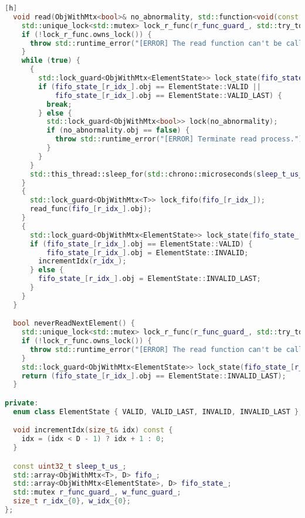 \documentclass[11pt,a4j]{jarticle}
\begin{document}
\begin{lstlisting}[language=c++,firstnumber=last,caption=MultiThreadFIFO,label=code:muitithreadfifo][h]
  void read(ObjWithMtx<bool>& no_abnormality, std::function<void(const T&)> read_func) {
    std::unique_lock<std::mutex> lock_r_func(r_func_guard_, std::try_to_lock);
    if (!lock_r_func.owns_lock()) {
      throw std::runtime_error("[ERROR] The read function can't be called at the same time from multiple threads.");
    }
    while (true) {
      {
        std::lock_guard<ObjWithMtx<ElementState>> lock_state(fifo_state_[r_idx_]);
        if (fifo_state_[r_idx_].obj == ElementState::VALID ||
            fifo_state_[r_idx_].obj == ElementState::VALID_LAST) {
          break;
        } else {
          std::lock_guard<ObjWithMtx<bool>> lock(no_abnormality);
          if (no_abnormality.obj == false) {
            throw std::runtime_error("[ERROR] Terminate read process.");
          }
        }
      }
      std::this_thread::sleep_for(std::chrono::microseconds(sleep_t_us_));
    }
    {
      std::lock_guard<ObjWithMtx<T>> lock_fifo(fifo_[r_idx_]);
      read_func(fifo_[r_idx_].obj);
    }
    {
      std::lock_guard<ObjWithMtx<ElementState>> lock_state(fifo_state_[r_idx_]);
      if (fifo_state_[r_idx_].obj == ElementState::VALID) {
          fifo_state_[r_idx_].obj = ElementState::INVALID;
        incrementIdx(r_idx_);
      } else {
        fifo_state_[r_idx_].obj = ElementState::INVALID_LAST;
      }
    }
  }

  bool neverReadNextElement() {
    std::unique_lock<std::mutex> lock_r_func(r_func_guard_, std::try_to_lock);
    if (!lock_r_func.owns_lock()) {
      throw std::runtime_error("[ERROR] The read function can't be called at the same time from multiple threads.");
    }
    std::lock_guard<ObjWithMtx<ElementState>> lock_state(fifo_state_[r_idx_]);
    return (fifo_state_[r_idx_].obj == ElementState::INVALID_LAST);
  }

private:
  enum class ElementState { VALID, VALID_LAST, INVALID, INVALID_LAST };

  void incrementIdx(size_t& idx) const {
    idx = (idx < D - 1) ? idx + 1 : 0;
  }

  const uint32_t sleep_t_us_;
  std::array<ObjWithMtx<T>, D> fifo_;
  std::array<ObjWithMtx<ElementState>, D> fifo_state_;
  std::mutex r_func_guard_, w_func_guard_;
  size_t r_idx_{0}, w_idx_{0};
};
\end{lstlisting}
\end{document}
